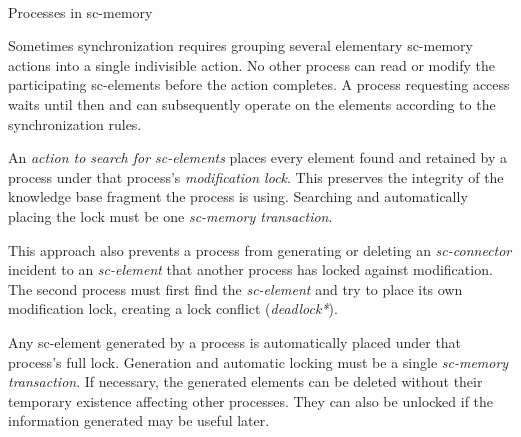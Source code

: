 \begin{frame}{\\Processes in sc-memory}
\topline
\justifying
\vspace{10mm}


\begin{SCn}
\begin{scnindent}
\begin{scneqtoset}
\end{scneqtoset}
\end{scnindent}
\end{SCn}
\end{frame}

\begin{frame}{}
	\topline
	\justifying
	\vspace{10mm}

Sometimes synchronization requires grouping several elementary sc-memory actions into a single indivisible action. No other process can read or modify the participating sc-elements before the action completes. A process requesting access waits until then and can subsequently operate on the elements according to the synchronization rules.

An \textit{action to search for sc-elements} places every element found and retained by a process under that process's \textit{modification lock}. This preserves the integrity of the knowledge base fragment the process is using. Searching and automatically placing the lock must be one \textit{sc-memory transaction}.

\end{frame}

\begin{frame}{}
	\topline
	\justifying
	\setlength{\emergencystretch}{2em}
	\vspace{10mm}

This approach also prevents a process from generating or deleting an \textit{sc-connector} incident to an \textit{sc-element} that another process has locked against modification. The second process must first find the \textit{sc-element} and try to place its own modification lock, creating a lock conflict (\textit{deadlock*}).

Any sc-element generated by a process is automatically placed under that process's full lock. Generation and automatic locking must be a single \textit{sc-memory transaction}. If necessary, the generated elements can be deleted without their temporary existence affecting other processes. They can also be unlocked if the information generated may be useful later.
\end{frame}

